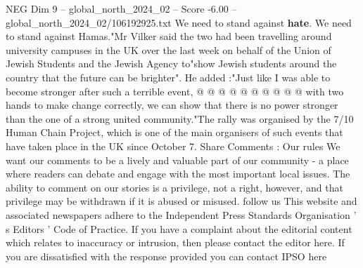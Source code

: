 \begin{textsample}{NEG Dim 9 – global\_north\_2024\_02 – Score -6.00 – global\_north\_2024\_02/106192925.txt}
We need to stand against \textbf{hate}.
We need to stand against Hamas."Mr Vilker said the two had been travelling around university campuses in the UK over the last week on behalf of the Union of Jewish Students and the Jewish Agency to"show Jewish students around the country that the future can be brighter".
He added :"Just like I was able to become stronger after such a terrible event, @ @ @ @ @ @ @ @ @ @ with two hands to make change correctly, we can show that there is no power stronger than the one of a strong united community."The rally was organised by the 7/10 Human Chain Project, which is one of the main organisers of such events that have taken place in the UK since October 7.
Share Comments : Our rules We want our comments to be a lively and valuable part of our community - a place where readers can debate and engage with the most important local issues.
The ability to comment on our stories is a privilege, not a right, however, and that privilege may be withdrawn if it is abused or misused. follow us This website and associated newspapers adhere to the Independent Press Standards Organisation ' s Editors ' Code of Practice.
If you have a complaint about the editorial content which relates to inaccuracy or intrusion, then please contact the editor here.
If you are dissatisfied with the response provided you can contact IPSO here

\end{textsample}
